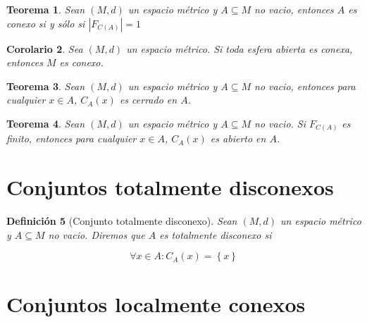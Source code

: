 \documentclass[oneside]{book} %
\theoremstyle{Teorema}
\newtheorem{Definicion}{Definición}[chapter]
\newtheorem{Teorema}[Definicion]{Teorema}
\newtheorem{Corolario}[Definicion]{Corolario}
\theoremstyle{Ejemplos}
\theoremstyle{[Obs]}
\newcommand{\card}[1]{\left|#1\right|} %
\renewcommand{\{}{\left\lbrace} %
\renewcommand{\}}{\right\rbrace} %
\renewcommand{\sc}{\subseteq} %
\begin{document}
			\begin{Teorema}\setlength{\parindent}{0em}
			
				Sean $(M, d)$ un espacio métrico y $A \sc M$ no vacio, entonces $A$ es conexo si y sólo si $\card{F_{C(A)}} = 1$
			
			\end{Teorema}

			\begin{Corolario}\setlength{\parindent}{0em}
			
				Sea $(M, d)$ un espacio métrico. Si toda esfera abierta es conexa, entonces $M$ es conexo.
			
			\end{Corolario}

			\begin{Teorema}\setlength{\parindent}{0em}
			
				Sean $(M, d)$ un espacio métrico y $A \sc M$ no vacio, entonces para cualquier $x \in A$, $C_{A}(x)$ es cerrado en $A$.
			
			\end{Teorema}

			\begin{Teorema}\setlength{\parindent}{0em}
			
				Sean $(M, d)$ un espacio métrico y $A \sc M$ no vacio. Si $F_{C(A)}$ es finito, entonces para cualquier $x \in A$, $C_{A}(x)$ es abierto en $A$.
			
			\end{Teorema}

		\section{Conjuntos totalmente disconexos} 

			\begin{Definicion}[Conjunto totalmente disconexo]\setlength{\parindent}{0em}
			
				Sean $(M, d)$ un espacio métrico y $A \sc M$ no vacio. Diremos que $A$ es totalmente disconexo si

				\[ \forall x \in A : C_{A}(x) = \{ x \} \]
			
			\end{Definicion}

		\section{Conjuntos localmente conexos}
\end{document}
